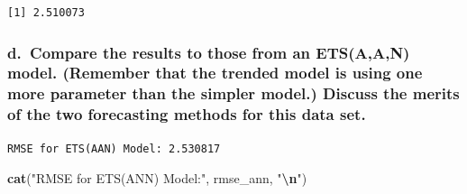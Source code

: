 \documentclass[
]{article}
\newenvironment{Shaded}{\begin{snugshade}}{\end{snugshade}}
\newcommand{\CommentTok}[1]{\textcolor[rgb]{0.56,0.35,0.01}{\textit{#1}}}
\newcommand{\DecValTok}[1]{\textcolor[rgb]{0.00,0.00,0.81}{#1}}
\newcommand{\FunctionTok}[1]{\textcolor[rgb]{0.13,0.29,0.53}{\textbf{#1}}}
\newcommand{\NormalTok}[1]{#1}
\newcommand{\OtherTok}[1]{\textcolor[rgb]{0.56,0.35,0.01}{#1}}
\newcommand{\SpecialCharTok}[1]{\textcolor[rgb]{0.81,0.36,0.00}{\textbf{#1}}}
\newcommand{\StringTok}[1]{\textcolor[rgb]{0.31,0.60,0.02}{#1}}
\begin{document}
\begin{verbatim}
[1] 2.510073
\end{verbatim}

\hypertarget{d.-compare-the-results-to-those-from-an-etsaan-model.-remember-that-the-trended-model-is-using-one-more-parameter-than-the-simpler-model.-discuss-the-merits-of-the-two-forecasting-methods-for-this-data-set.}{%
\subsubsection{d.~Compare the results to those from an ETS(A,A,N) model.
(Remember that the trended model is using one more parameter than the
simpler model.) Discuss the merits of the two forecasting methods for
this data
set.}\label{d.-compare-the-results-to-those-from-an-etsaan-model.-remember-that-the-trended-model-is-using-one-more-parameter-than-the-simpler-model.-discuss-the-merits-of-the-two-forecasting-methods-for-this-data-set.}}

\begin{Shaded}
\end{Shaded}

\begin{verbatim}
RMSE for ETS(AAN) Model: 2.530817 
\end{verbatim}

\begin{Shaded}
\begin{Highlighting}[]
\FunctionTok{cat}\NormalTok{(}\StringTok{"RMSE for ETS(ANN) Model:"}\NormalTok{, rmse\_ann, }\StringTok{"}\SpecialCharTok{\textbackslash{}n}\StringTok{"}\NormalTok{)}
\end{Highlighting}
\end{Shaded}
\end{document}
